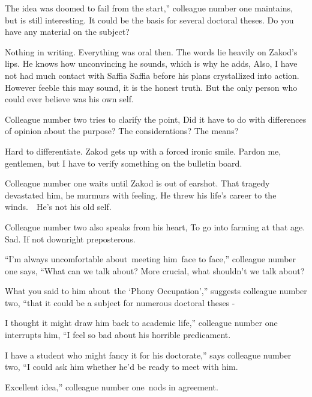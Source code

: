 \documentclass[twoside,11pt]{book}
\begin{document}
{\textquotedbl}The idea was doomed to fail from the start,'' colleague number one maintains, {\textquotedbl}but is still
interesting. It could be the basis for several doctoral theses. Do you have any material on the subject?{\textquotedbl}


{\textquotedbl}Nothing in writing. Everything was oral then.{\textquotedbl} The words lie heavily on Zakod's lips. He
knows how unconvincing he sounds, which is why he adds, {\textquotedbl}Also, I have not had much contact with Saffia
Saffia before his plans crystallized into action.{\textquotedbl} However feeble this may sound, it is the honest truth.
But the only person who could ever believe was his own self.\ 

Colleague number two tries to clarify the point, {\textquotedbl}Did it have to do with differences of opinion about the
purpose? The considerations? The means?{\textquotedbl} 

{\textquotedbl}Hard to differentiate.{\textquotedbl} Zakod gets up with a forced ironic smile. {\textquotedbl}Pardon me,
gentlemen, but I have to verify something on the bulletin board.{\textquotedbl}

Colleague number one waits until Zakod is out of earshot. {\textquotedbl}That tragedy devastated him,{\textquotedbl} he
murmurs with feeling. {\textquotedbl}He threw his life's career to the winds.\ \ He's not his old self.{\textquotedbl} 

Colleague number two also speaks from his heart, {\textquotedbl}To go into farming at that age. Sad. If not downright
preposterous.{\textquotedbl} 

{}``I'm always uncomfortable about~meeting him~face to face,'' colleague number one says, ``What can we talk about? More
crucial, what shouldn't we talk about?{\textquotedbl}

{\textquotedbl}What you said to him about~the `Phony Occupation',{}'' suggests colleague number two, ``that it could be
a subject for numerous doctoral theses -{\textquotedbl} 

{\textquotedbl}I thought it might draw him back to academic life,'' colleague number one interrupts him, ``I feel so bad
about his horrible predicament.{\textquotedbl} 

{\textquotedbl}I have a student who might fancy it for his doctorate,'' says colleague number two, ``I could ask him
whether he'd be ready to meet with him.{\textquotedbl} 

{\textquotedbl}Excellent idea,'' colleague number one~nods in agreement. 
\end{document}
